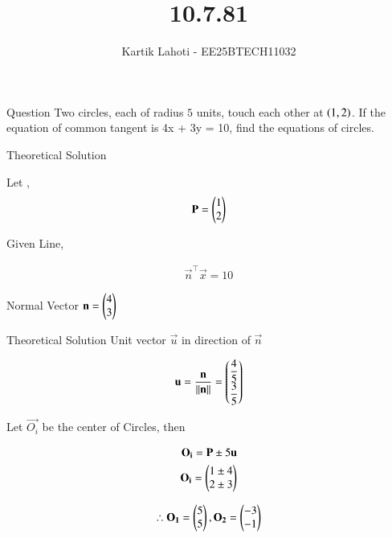 \documentclass{beamer}
\title %
{10.7.81}
\author 
{Kartik Lahoti - EE25BTECH11032}
\begin{document}
\frame{\titlepage}
\begin{frame}{Question}
Two circles, each of radius $5$ units, touch each other at $\left(1,2\right)$. If the equation of common tangent is 4x + 3y = 10, find the equations of circles.
\end{frame}

\begin{frame}{Theoretical Solution}

Let , 
\begin{align}
    \mathbf{P} = \begin{pmatrix}1\\2\end{pmatrix}
\end{align}


Given Line, 

\begin{align}
    \vec{n}^{\top}\vec{x} = 10
\end{align}

Normal Vector $\mathbf{n} = \begin{pmatrix}4 \\ 3\end{pmatrix}$

\end{frame}

\begin{frame}{Theoretical Solution}
Unit vector $\vec{u}$ in direction of $\vec{n}$

\begin{align}
    \mathbf{u} = \frac{\mathbf{n}}{\left\lVert\mathbf{n}\right\rVert} = \begin{pmatrix}\dfrac{4}{5} \\ \dfrac{3}{5}\end{pmatrix}
\end{align}

Let $\vec{O_i}$ be the center of Circles, then

\begin{align}
    \mathbf{O_i} = \mathbf{P} \pm 5\mathbf{u} \\ 
    \mathbf{O_i} = \begin{pmatrix}1\pm4 \\ 2\pm3\end{pmatrix} 
\end{align} 


\begin{align}
    \therefore \mathbf{O_1} = \begin{pmatrix}5 \\ 5\end{pmatrix} , \mathbf{O_2} = \begin{pmatrix}-3\\-1\end{pmatrix}
\end{align}
\end{frame}
\end{document}
